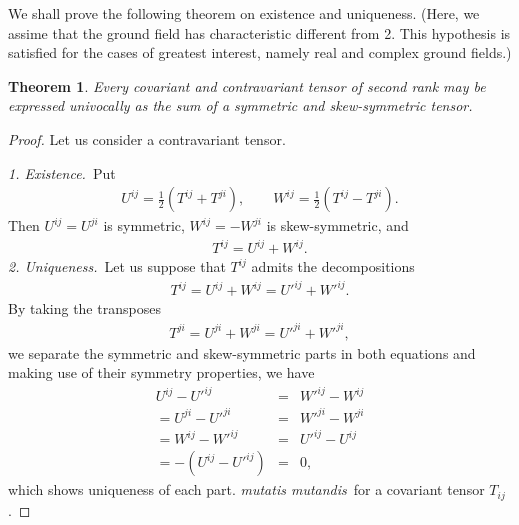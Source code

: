 \documentclass[12pt]{article}
\newtheorem{theorem*}{Theorem}
\begin{document}
We shall prove the following theorem on existence and uniqueness.  (Here,
we assime that the ground field has characteristic different from 2. 
This hypothesis is satisfied for the cases of greatest interest, 
namely real and complex ground fields.)
\begin{theorem*} Every covariant and contravariant tensor of second rank may be expressed univocally as the sum of a symmetric and skew-symmetric tensor.
\end{theorem*}
\begin{proof} 
Let us consider a contravariant tensor. 

{\em 1. Existence.}\, Put
\begin{align*}
U^{ij}=\frac{1}{2}(T^{ij}+T^{ji}), \qquad  W^{ij}=\frac{1}{2}(T^{ij}-T^{ji}).
\end{align*}
Then $U^{ij}=U^{ji}$ is symmetric,  $W^{ij}=-W^{ji}$ is skew-symmetric, and
\begin{align*}
T^{ij}=U^{ij}+W^{ij}.
\end{align*}
{\em 2. Uniqueness.}\, Let us suppose that $T^{ij}$ admits the decompositions
\begin{align*}
T^{ij}=U^{ij}+W^{ij}=U'^{ij}+W'^{ij}.
\end{align*}
By taking the transposes
\begin{align*}
T^{ji}=U^{ji}+W^{ji}=U'^{ji}+W'^{ji},
\end{align*}
we separate the symmetric and skew-symmetric parts in both equations and making use of their symmetry properties, we have
\begin{eqnarray*}
U^{ij}-U'^{ij} & = & W'^{ij}-W^{ij} \\
=U^{ji}-U'^{ji} & = & W'^{ji}-W^{ji} \\
=W^{ij}-W'^{ij} & = & U'^{ij}-U^{ij} \\
=-(U^{ij}-U'^{ij}) & = & 0,
\end{eqnarray*}
which shows uniqueness of each part. {\em mutatis mutandis}\, for a covariant tensor $T_{ij}$.
\end{proof}
\end{document}
